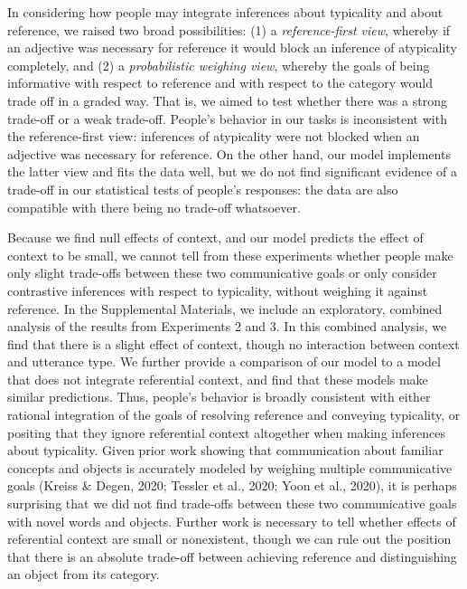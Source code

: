 \documentclass[
  english,
  man,floatsintext]{apa6}
\begin{document}
In considering how people may integrate inferences about typicality and about reference, we raised two broad possibilities: (1) a \emph{reference-first view}, whereby if an adjective was necessary for reference it would block an inference of atypicality completely, and (2) a \emph{probabilistic weighing view}, whereby the goals of being informative with respect to reference and with respect to the category would trade off in a graded way. That is, we aimed to test whether there was a strong trade-off or a weak trade-off. People's behavior in our tasks is inconsistent with the reference-first view: inferences of atypicality were not blocked when an adjective was necessary for reference. On the other hand, our model implements the latter view and fits the data well, but we do not find significant evidence of a trade-off in our statistical tests of people's responses: the data are also compatible with there being no trade-off whatsoever.

Because we find null effects of context, and our model predicts the effect of context to be small, we cannot tell from these experiments whether people make only slight trade-offs between these two communicative goals or only consider contrastive inferences with respect to typicality, without weighing it against reference. In the Supplemental Materials, we include an exploratory, combined analysis of the results from Experiments 2 and 3. In this combined analysis, we find that there is a slight effect of context, though no interaction between context and utterance type. We further provide a comparison of our model to a model that does not integrate referential context, and find that these models make similar predictions. Thus, people's behavior is broadly consistent with either rational integration of the goals of resolving reference and conveying typicality, or positing that they ignore referential context altogether when making inferences about typicality. Given prior work showing that communication about familiar concepts and objects is accurately modeled by weighing multiple communicative goals (Kreiss \& Degen, 2020; Tessler et al., 2020; Yoon et al., 2020), it is perhaps surprising that we did not find trade-offs between these two communicative goals with novel words and objects. Further work is necessary to tell whether effects of referential context are small or nonexistent, though we can rule out the position that there is an absolute trade-off between achieving reference and distinguishing an object from its category.
\end{document}
